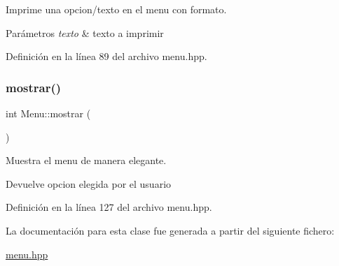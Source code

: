 Imprime una opcion/texto en el menu con formato. 


\begin{DoxyParams}{Parámetros}
{\em texto} & texto a imprimir \\
\hline
\end{DoxyParams}


Definición en la línea 89 del archivo menu.\+hpp.

\mbox{\label{classMenu_a909877f977f662803994c67e862b4b87}} 
\subsubsection{\texorpdfstring{mostrar()}{mostrar()}}
{\footnotesize\ttfamily int Menu\+::mostrar (\begin{DoxyParamCaption}{ }\end{DoxyParamCaption})\hspace{0.3cm}{\ttfamily [inline]}}



Muestra el menu de manera elegante. 

\begin{DoxyReturn}{Devuelve}
opcion elegida por el usuario 
\end{DoxyReturn}


Definición en la línea 127 del archivo menu.\+hpp.



La documentación para esta clase fue generada a partir del siguiente fichero\+:\begin{DoxyCompactItemize}
\item 
\hyperlink{menu_8hpp}{menu.\+hpp}\end{DoxyCompactItemize}
